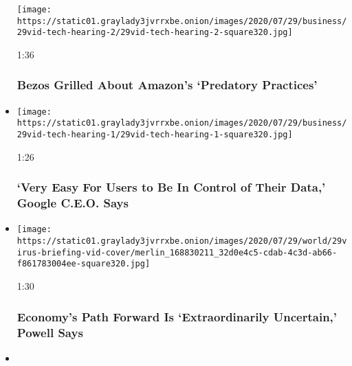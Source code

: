 \begin{itemize}
  \texttt{[image: https://static01.graylady3jvrrxbe.onion/images/2020/07/29/business/29vid-tech-hearing-2/29vid-tech-hearing-2-square320.jpg]}

  1:36

  \hypertarget{bezos-grilled-about-amazons-predatory-practices}{%
  \subsubsection{Bezos Grilled About Amazon's `Predatory
  Practices'}\label{bezos-grilled-about-amazons-predatory-practices}}
\item
  \href{https://www.nytimes3xbfgragh.onion/video/us/politics/100000007263148/google-data-privacy.html?action=click\&module=video-series-bar\&region=header\&pgtype=Article\&playlistId=video/u-s}{}

  \texttt{[image: https://static01.graylady3jvrrxbe.onion/images/2020/07/29/business/29vid-tech-hearing-1/29vid-tech-hearing-1-square320.jpg]}

  1:26

  \hypertarget{very-easy-for-users-to-be-in-control-of-their-data-google-ceo-says}{%
  \subsubsection{`Very Easy For Users to Be In Control of Their Data,'
  Google C.E.O.
  Says}\label{very-easy-for-users-to-be-in-control-of-their-data-google-ceo-says}}
\item
  \href{https://www.nytimes3xbfgragh.onion/video/us/100000007262574/fed-powell-economy-coronavirus.html?action=click\&module=video-series-bar\&region=header\&pgtype=Article\&playlistId=video/u-s}{}

  \texttt{[image: https://static01.graylady3jvrrxbe.onion/images/2020/07/29/world/29virus-briefing-vid-cover/merlin\_168830211\_32d0e4c5-cdab-4c3d-ab66-f861783004ee-square320.jpg]}

  1:30

  \hypertarget{economys-path-forward-is-extraordinarily-uncertain-powell-says}{%
  \subsubsection{Economy's Path Forward Is `Extraordinarily Uncertain,'
  Powell
  Says}\label{economys-path-forward-is-extraordinarily-uncertain-powell-says}}
\item
  \href{https://www.nytimes3xbfgragh.onion/video/us/100000007260854/san-francisco-fire.html?action=click\&module=video-series-bar\&region=header\&pgtype=Article\&playlistId=video/u-s}{}


\end{itemize}
